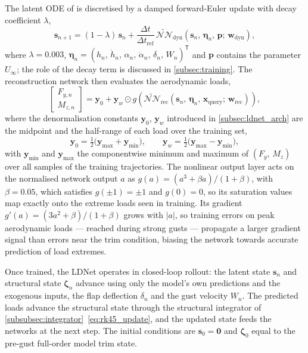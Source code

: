 The latent ODE of  is discretised by a damped forward-Euler update with decay coefficient $\lambda$,
\begin{equation}
\mathbf{s}_{n+1} = (1-\lambda)\,\mathbf{s}_n
    + \frac{\Delta t}{\Delta t_\mathrm{ref}}\,
    \widetilde{\mathcal{NN}}_\mathrm{dyn}\!\left(
        \mathbf{s}_n,\, \boldsymbol{\eta}_n,\, \mathbf{p};\, \mathbf{w}_\mathrm{dyn}
    \right),
\label{eq:latent_dyn}
\end{equation}
where $\lambda = 0.003$, $\boldsymbol{\eta}_n = (h_n,\,\dot{h}_n,\,\alpha_n,\,\dot{\alpha}_n,\,\delta_n,\,W_n)^\mathsf{T}$ and $\mathbf{p}$ contains the parameter $U_\infty$; the role of the decay term is discussed in \cref{subsec:training}. The reconstruction network then evaluates the aerodynamic loads,
\[
\begin{bmatrix} F_{y,n} \\ M_{z,n} \end{bmatrix}
= \mathbf{y}_0 + \mathbf{y}_w \odot
    g\!\left(
        \widetilde{\mathcal{NN}}_\mathrm{rec}\!\left(
            \mathbf{s}_n,\, \boldsymbol{\eta}_n,\, \mathbf{x}_\mathrm{query};\,
            \mathbf{w}_\mathrm{rec}
        \right)
    \right),
\]
where the denormalisation constants $\mathbf{y}_0$, $\mathbf{y}_w$ introduced in \cref{subsec:ldnet_arch} are the midpoint and the half-range of each load over the training set,
\[
\mathbf{y}_0 = \tfrac{1}{2}\bigl(\mathbf{y}_{\max} + \mathbf{y}_{\min}\bigr),
\qquad
\mathbf{y}_w = \tfrac{1}{2}\bigl(\mathbf{y}_{\max} - \mathbf{y}_{\min}\bigr),
\]
with $\mathbf{y}_{\min}$ and $\mathbf{y}_{\max}$ the componentwise minimum and maximum of $(F_y,\,M_z)$ over all samples of the training trajectories. The nonlinear output layer acts on the normalised network output $a$ as $g(a) = (a^3 + \beta a)/(1+\beta)$, with $\beta = 0.05$, which satisfies $g(\pm 1)=\pm 1$ and $g(0)=0$, so its saturation values map exactly onto the extreme loads seen in training. Its gradient $g'(a) = (3a^2+\beta)/(1+\beta)$ grows with $|a|$, so training errors on peak aerodynamic loads --- reached during strong gusts --- propagate a larger gradient signal than errors near the trim condition, biasing the network towards accurate prediction of load extremes.

Once trained, the LDNet operates in closed-loop rollout: the latent state $\mathbf{s}_n$ and structural state $\boldsymbol{\zeta}_n$ advance using only the model's own predictions and the exogenous inputs, the flap deflection $\delta_n$ and the gust velocity $W_n$. The predicted loads advance the structural state through the structural integrator of
\cref{subsubsec:integrator}~\eqref{eq:rk45_update}, and the updated state feeds the networks at the next step. The initial conditions are $\mathbf{s}_0 = \mathbf{0}$ and $\boldsymbol{\zeta}_0$ equal to the pre-gust full-order model trim state.

